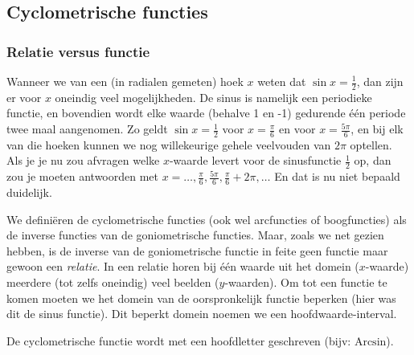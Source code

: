 


\subsection{Cyclometrische functies}

\subsubsection{Relatie versus functie}

Wanneer we van een (in radialen gemeten) hoek $x$ weten dat $\sin x=\frac{1}{2}$,
dan zijn er voor $x$ oneindig veel mogelijkheden. De sinus is namelijk
een periodieke functie, en bovendien wordt elke waarde (behalve 1
en -1) gedurende \'e\'en periode twee maal aangenomen. Zo geldt $\sin x=\frac{1}{2}$
voor $x=\frac{\pi}{6}$ en voor $x=\frac{5\pi}{6}$, en bij elk van
die hoeken kunnen we nog willekeurige gehele veelvouden van $2\pi$
optellen. Als je je nu zou afvragen welke $x$-waarde levert voor
de sinusfunctie $\frac{1}{2}$ op, dan zou je moeten antwoorden met
$x=\ldots,\frac{\pi}{6},\frac{5\pi}{6},\frac{\pi}{6}+2\pi,\ldots$
En dat is nu niet bepaald duidelijk.




We defini\"eren de cyclometrische functies (ook wel arcfuncties
of boogfuncties) als de inverse functies van de goniometrische functies.
Maar, zoals we net gezien hebben, is de inverse van de goniometrische
functie in feite geen functie maar gewoon een \emph{relatie}. In een
relatie horen bij \'e\'en waarde uit het domein ($x$-waarde) meerdere
(tot zelfs oneindig) veel beelden ($y$-waarden). Om tot een functie
te komen moeten we het domein van de oorspronkelijk functie beperken
(hier was dit de sinus functie). Dit beperkt domein noemen we een
hoofdwaarde-interval.




De cyclometrische functie wordt met een hoofdletter geschreven
(bijv: $\textrm{Arcsin}$).

